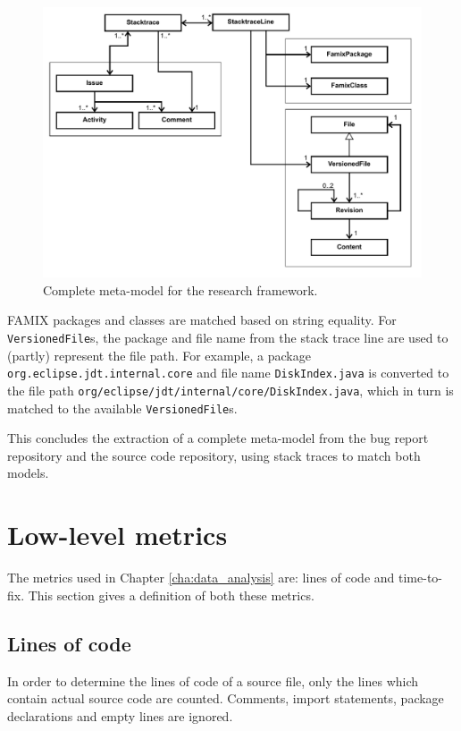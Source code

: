 \begin{figure}[!ht]
	\centering
		\includegraphics[width=1\textwidth]{img/linked_meta_model.pdf}
	\caption{Complete meta-model for the research framework.}
	\label{fig:complete_meta_model}
\end{figure}

\begin{sloppypar}
FAMIX packages and classes are matched based on string equality. For \texttt{VersionedFile}s, the package and file name from the stack trace line are used to (partly) represent the file path. For example, a package \texttt{org.eclipse.jdt.internal.core} and file name \texttt{DiskIndex.java} is converted to the file path \texttt{org/eclipse/jdt/internal/core/DiskIndex.java}, which in turn is matched to the available \texttt{VersionedFile}s.
\end{sloppypar}

This concludes the extraction of a complete meta-model from the bug report repository and the source code repository, using stack traces to match both models.

\section{Low-level metrics} %
\label{sec:low_level_metrics}
The metrics used in Chapter \ref{cha:data_analysis} are: lines of code and time-to-fix. This section gives a definition of both these metrics.

\subsection{Lines of code} %
In order to determine the lines of code of a source file, only the lines which contain actual source code are counted. Comments, import statements, package declarations and empty lines are ignored.

